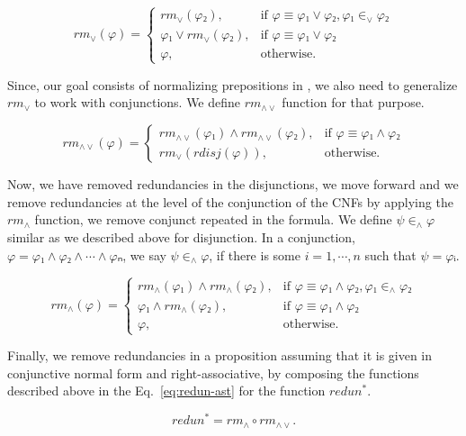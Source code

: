 \documentclass[../main.tex]{subfiles}
\begin{document}
\begin{equation*}
\label{eq:rm-or}
  rm_{∨}(φ) =
  \begin{cases}
    rm_{∨}(φ₂), &\text{if }φ ≡ φ₁ ∨ φ₂, φ₁ ∈_{∨} φ₂\\
    φ₁ ∨ rm_{∨}(φ₂), &\text{if }φ ≡ φ₁ ∨ φ₂\\
    φ,  &\text{otherwise.}
  \end{cases}
\end{equation*}

Since, our goal consists of normalizing prepositions in , we also need to generalize $rm_{∨}$ to work with conjunctions. We define $rm_{∧∨}$ function for that purpose.

\begin{equation*}
\label{eq:rm-and-or}
  rm_{∧∨}(φ) =
  \begin{cases}
    rm_{∧∨}(φ₁) ∧ rm_{∧∨}(φ₂), &\text{if }φ ≡ φ₁ ∧ φ₂\\
    rm_{∨}(rdisj(φ)),  &\text{otherwise.}
  \end{cases}
\end{equation*}

Now, we have removed redundancies in the disjunctions, we move forward and we remove redundancies at the level of the conjunction of the CNFs by applying the $rm_{∧}$ function, we remove conjunct repeated in the formula. We define $ψ ∈_{∧} φ$ similar as we described above for disjunction. In a conjunction, $φ = φ₁ ∧ φ₂ ∧ \cdots ∧ φₙ$, we say
$ψ ∈_{∧} φ$, if there is some $i = 1, \cdots, n$ such that $ψ = φᵢ$.

\begin{equation*}
\label{eq:rm-and}
  rm_{∧}(φ) =
  \begin{cases}
    rm_{∧}(φ₁) ∧ rm_{∧}(φ₂), &\text{if }φ ≡ φ₁ ∧ φ₂, φ₁ ∈_{∧} φ₂\\
    φ₁ ∧ rm_{∧}(φ₂), &\text{if }φ ≡ φ₁ ∧ φ₂\\
    φ,  &\text{otherwise.}
  \end{cases}
\end{equation*}

Finally, we remove redundancies in a proposition assuming that it is given in conjunctive normal form and right-associative, by composing the functions described above in the Eq.~\ref{eq:redun-ast}
for the function $redun^{*}$.

\begin{equation*}
  \label{eq:redun-ast}
  redun^{*} = rm_{∧} ∘ rm_{∧∨}.
\end{equation*}
\end{document}
